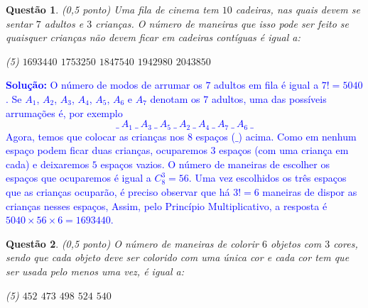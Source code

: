 \documentclass[oneside,a4paper,12pt]{article}
\newcommand{\under}{\texttt{\char`_}}
\newcommand{\negrito}[1]{\mbox{\boldmath{$#1$}}}
\theoremstyle{Colorido}
\theoremstyle{solu}
\theoremstyle{dotlessP}
\newcommand{\solucao}[1]{\textcolor{blue}{\textbf{Solução:} #1}}
\newtheorem{sol}{Questão}
\begin{document}
	\begin{sol}
\textit{(0,5 ponto)} 
Uma fila de cinema tem $10$ cadeiras, nas quais devem se sentar $7$ adultos e $3$ crianças. O número de maneiras que isso pode ser feito se quaisquer  crianças não devem ficar em cadeiras contíguas é igual a:
\begin{tasks}[counter-format={(tsk[a])},label-width=3.6ex, label-format = {\bfseries}, column-sep = {20pt}](5)
\task[\textcolor{blue}{$\negrito{(a)} $}] $1693440$
\task[\textcolor{blue}{$\negrito{(b)} $}] $1753250$ 
\task[\textcolor{blue}{$\negrito{(c)} $}] $1847540$
\task[\textcolor{blue}{$\negrito{(d)} $}] $1942980$
\task[\textcolor{blue}{$\negrito{(e)} $}] $2043850$
\end{tasks}
\end{sol}
\solucao{O número de modos de arrumar os $7$ adultos em fila é igual a $7!=5040$. Se $A_1$, $A_2$, $A_3$, $A_4$, $A_5$, $A_6$ e $A_7$ denotam os $7$ adultos, uma das possíveis arrumações é, por exemplo\[\under  \ A_1 \ \under \  A_3 \ \under \ A_5 \ \under \ A_2 \ \under \ A_4 \ \under \ A_7 \ \under \ A_6 \ \under \] Agora, temos que colocar as crianças nos $8$ espaços ($\under$) acima. Como em nenhum espaço podem ficar duas crianças, ocuparemos $3$ espaços (com uma criança em cada) e deixaremos $5$ espaços vazios. O número de maneiras de escolher os espaços que ocuparemos é igual a $C_8^3=56$. Uma vez escolhidos os três espaços que as crianças ocuparão, é preciso observar que há $3!=6$ maneiras de dispor as crianças nesses espaços, Assim, pelo Princípio Multiplicativo, a resposta é $5040\times56\times6=1693440$.}
		\newpage	
	\begin{sol}
\textit{(0,5 ponto)} \newline \newline
O número de maneiras de colorir $6$ objetos com $3$ cores, sendo que cada objeto deve ser colorido com uma única cor e cada cor tem que ser usada pelo menos uma vez, é igual a:
\begin{tasks}[counter-format={(tsk[a])},label-width=3.6ex, label-format = {\bfseries}, column-sep = {20pt}](5)
\task[\textcolor{blue}{$\negrito{(a)} $}] $452$
\task[\textcolor{blue}{$\negrito{(b)} $}] $473$
\task[\textcolor{blue}{$\negrito{(c)} $}] $498$      
\task[\textcolor{blue}{$\negrito{(d)} $}] $524$
\task[\textcolor{blue}{$\negrito{(e)} $}] $540$
\end{tasks}
\end{sol}
\end{document}
